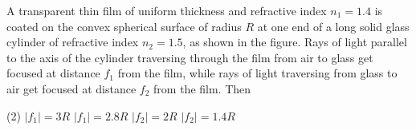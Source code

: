 
\item A transparent thin film of uniform thickness and refractive index \( n_1 = 1.4 \) is coated on the convex spherical surface of radius \( R \) at one end of a long solid glass cylinder of refractive index \( n_2 = 1.5 \), as shown in the figure. Rays of light parallel to the axis of the cylinder traversing through the film from air to glass get focused at distance \( f_1 \) from the film, while rays of light traversing from glass to air get focused at distance \( f_2 \) from the film. Then
    \begin{center}
    \end{center}
    \begin{tasks}(2)
        \task \( |f_1| = 3R \)
        \task \( |f_1| = 2.8R \)
        \task \( |f_2| = 2R \)\ans
        \task \( |f_2| = 1.4R \)
    \end{tasks}
